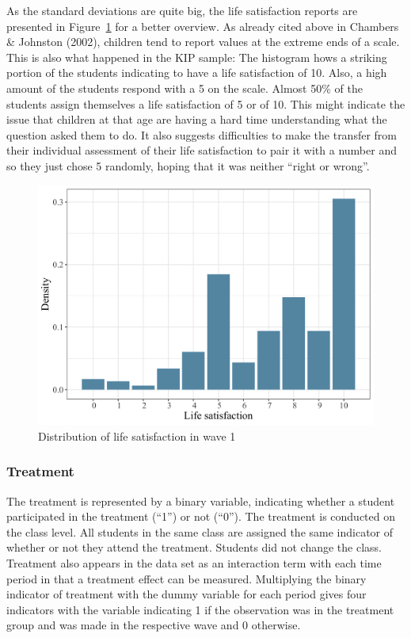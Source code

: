 \documentclass[a4, 12pt]{article}
\begin{document}
As the standard deviations are quite big, the life satisfaction reports are presented in Figure~\ref{fig:hist-lsat} for a better overview. As already cited above in Chambers \& Johnston (2002), children tend to report values at the extreme ends of a scale. This is also what happened in the KIP sample: The histogram hows a striking portion of the students indicating to have a life satisfaction of 10. Also, a high amount of the students respond with a 5 on the scale. Almost 50\% of the students assign themselves a life satisfaction of 5 or of 10. This might indicate the issue that children at that age are having a hard time understanding what the question asked them to do. It also suggests difficulties to make the transfer from their individual assessment of their life satisfaction to pair it with a number and so they just chose 5 randomly, hoping that it was neither ``right or wrong''.

\begin{figure}[H]

{\centering \includegraphics[width=0.8\linewidth,]{../figures/lsat_bar} 

}

\caption{Distribution of life satisfaction in wave 1}\label{fig:hist-lsat}
\end{figure}

\hypertarget{treatment}{%
\subsubsection{Treatment}\label{treatment}}

The treatment is represented by a binary variable, indicating whether a student participated in the treatment (``1'') or not (``0''). The treatment is conducted on the class level. All students in the same class are assigned the same indicator of whether or not they attend the treatment. Students did not change the class. Treatment also appears in the data set as an interaction term with each time period in that a treatment effect can be measured. Multiplying the binary indicator of treatment with the dummy variable for each period gives four indicators with the variable indicating 1 if the observation was in the treatment group and was made in the respective wave and 0 otherwise.
\end{document}
